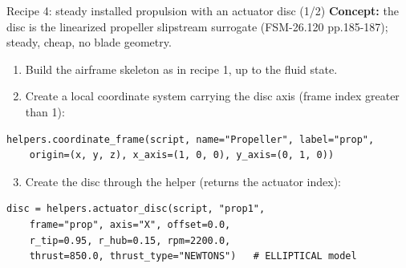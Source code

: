 \documentclass[aspectratio=169,10pt]{beamer}
\begin{document}
\begin{frame}[fragile]{Recipe 4: steady installed propulsion with an actuator disc (1/2)}
  \textbf{Concept:} the disc is the linearized propeller slipstream surrogate (FSM-26.120 pp.185-187); steady, cheap, no blade geometry.
  \begin{enumerate}
    \item Build the airframe skeleton as in recipe 1, up to the fluid state.
    \item Create a local coordinate system carrying the disc axis (frame index greater than 1):
  \end{enumerate}
\begin{lstlisting}
helpers.coordinate_frame(script, name="Propeller", label="prop",
    origin=(x, y, z), x_axis=(1, 0, 0), y_axis=(0, 1, 0))
\end{lstlisting}
  \begin{enumerate}
    \setcounter{enumi}{2}
    \item Create the disc through the helper (returns the actuator index):
  \end{enumerate}
\begin{lstlisting}
disc = helpers.actuator_disc(script, "prop1",
    frame="prop", axis="X", offset=0.0,
    r_tip=0.95, r_hub=0.15, rpm=2200.0,
    thrust=850.0, thrust_type="NEWTONS")   # ELLIPTICAL model
\end{lstlisting}
\end{frame}
\end{document}
